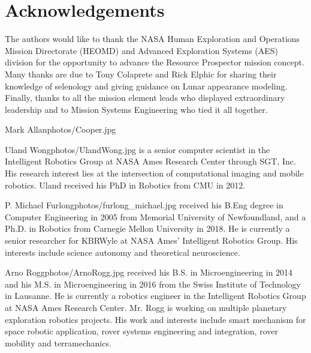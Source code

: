 \documentclass[twocolumn,letterpaper]{IEEEAerospaceCLS}  %
\begin{document}
\section{Acknowledgements}
The authors would like to thank the NASA Human Exploration and Operations Mission Directorate (HEOMD) and Advanced Exploration Systems (AES) division for the opportunity to advance the Resource Prospector mission concept.  Many thanks are due to Tony Colaprete and Rick Elphic for sharing their knowledge of selenology and giving guidance on Lunar appearance modeling.  Finally, thanks to all the mission element leads who displayed extraordinary leadership and to Mission Systems Engineering who tied it all together.  




\thebiography

\begin{biographywithpic}
{Mark Allan}{photos/Cooper.jpg} 
\end{biographywithpic} 


\begin{biographywithpic}
{Uland Wong}{photos/UlandWong.jpg} is a senior computer scientist in the Intelligent Robotics Group at NASA Ames Research Center through SGT, Inc.  His research interest lies at the intersection of computational imaging and mobile robotics.  Uland received his PhD in Robotics from CMU in 2012. 
\end{biographywithpic} 

\begin{biographywithpic}
{P. Michael Furlong}{photos/furlong_michael.jpg} received his B.Eng degree in Computer Engineering in 2005 from Memorial University of Newfoundland, and a Ph.D. in Robotics from Carnegie Mellon University in 2018.  He is currently a senior researcher for KBRWyle at NASA Ames' Intelligent Robotics Group.  His interests include science autonomy and theoretical neuroscience.
\end{biographywithpic} 

\begin{biographywithpic}
{Arno Rogg}{photos/ArnoRogg.jpg} received his B.S. in Microengineering in 2014 and his M.S. in Microengineering in 2016 from the Swiss Institute of Technology in Lausanne. He is currently a robotics engineer in the Intelligent Robotics Group at NASA Ames Research Center. Mr. Rogg is working on multiple planetary exploration robotics projects. His work and interests include smart mechanism for space robotic application, rover systems engineering and integration, rover mobility and terramechanics.
\end{biographywithpic} 
\end{document}
